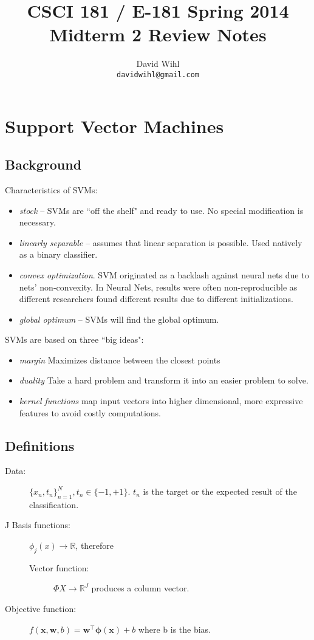 \documentclass[11pt, oneside]{article}   	%
\title{CSCI 181 / E-181 Spring 2014 \\ 
{\large Midterm 2 Review Notes}
}
\author{
  David Wihl\\
  \texttt{davidwihl@gmail.com}
}
\begin{document}
\maketitle

\begingroup
\hypersetup{linkcolor=blue}
\tableofcontents
\endgroup

\section{Support Vector Machines}

\subsection{Background}
Characteristics of SVMs:
\begin{itemize}
	\item \emph{stock} -- SVMs are ``off the shelf" and ready to use. No special modification is necessary.
	\item \emph{linearly separable} -- assumes that linear separation is possible. Used natively as a binary classifier.
	\item \emph{convex optimization}. SVM originated as a backlash against neural nets due to nets' non-convexity. In Neural Nets, results were often non-reproducible as different researchers found different results due to different initializations.
	\item \emph{global optimum} -- SVMs will find the global optimum.
\end{itemize}

SVMs are based on three ``big ideas":
\begin{itemize}
	\item \emph{margin} Maximizes distance between the closest points
	\item \emph{duality} Take a hard problem and transform it into an easier problem to solve.
	\item \emph{kernel functions} map input vectors into higher dimensional, more expressive features to avoid costly computations.
\end{itemize}

\subsection{Definitions}

\begin{description}
	\item[Data:] $\{x_n,t_n\}_{n=1}^N, t_n \in \{-1, +1\}$. $t_n$ is the target or the expected result of the classification.
	\item[J Basis functions:] $\phi_j(x)\rightarrow\mathbb{R}$, therefore
	\begin{description}
		\item[Vector function:] $\Phi X \rightarrow \mathbb{R}^J$ produces a column vector.
	\end{description}
	\item[Objective function:]
$f(\textbf{x},\textbf{w},b) = \textbf{w}^\intercal \mathbf{\phi}(\textbf{x})  + b$
where b is the bias.
\end{description}
\end{document}

